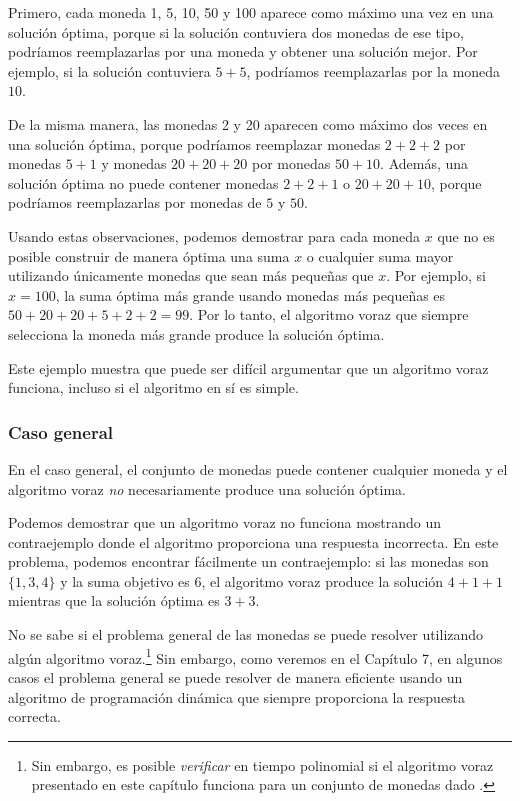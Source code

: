 Primero, cada moneda 1, 5, 10, 50 y 100 aparece
como máximo una vez en una solución óptima,
porque si la solución contuviera dos monedas de ese tipo,
podríamos reemplazarlas por una moneda y
obtener una solución mejor.
Por ejemplo, si la solución contuviera
$5+5$, podríamos reemplazarlas por la moneda $10$.

De la misma manera, las monedas 2 y 20 aparecen
como máximo dos veces en una solución óptima,
porque podríamos reemplazar
monedas $2+2+2$ por monedas $5+1$ y
monedas $20+20+20$ por monedas $50+10$.
Además, una solución óptima no puede contener
monedas $2+2+1$ o $20+20+10$,
porque podríamos reemplazarlas por monedas de $5$ y $50$.

Usando estas observaciones,
podemos demostrar para cada moneda $x$ que
no es posible construir de manera óptima
una suma $x$ o cualquier suma mayor utilizando únicamente monedas
que sean más pequeñas que $x$.
Por ejemplo, si $x=100$, la suma óptima más grande
usando monedas más pequeñas es $50+20+20+5+2+2=99$.
Por lo tanto, el algoritmo voraz que siempre selecciona
la moneda más grande produce la solución óptima.

Este ejemplo muestra que puede ser difícil
argumentar que un algoritmo voraz funciona,
incluso si el algoritmo en sí es simple.

\subsubsection{Caso general}

En el caso general, el conjunto de monedas puede contener cualquier moneda
y el algoritmo voraz \emph{no} necesariamente produce
una solución óptima.

Podemos demostrar que un algoritmo voraz no funciona
mostrando un contraejemplo
donde el algoritmo proporciona una respuesta incorrecta.
En este problema, podemos encontrar fácilmente un contraejemplo:
si las monedas son $\{1,3,4\}$ y la suma objetivo
es 6, el algoritmo voraz produce la solución
$4+1+1$ mientras que la solución óptima es $3+3$.

No se sabe si el problema general de las monedas
se puede resolver utilizando algún algoritmo voraz.\footnote{Sin embargo, es posible
  \emph{verificar} en tiempo polinomial
  si el algoritmo voraz presentado en este capítulo funciona para
  un conjunto de monedas dado \cite{pea05}.}
Sin embargo, como veremos en el Capítulo 7,
en algunos casos
el problema general se puede resolver de manera eficiente
usando un algoritmo de programación dinámica que siempre proporciona la
respuesta correcta.


